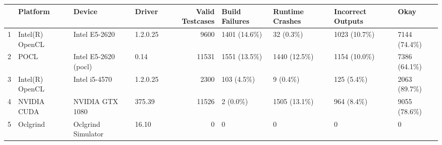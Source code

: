 \begin{tabular}{llllrllll}
\toprule
{} &         Platform &                Device &    Driver &  Valid Testcases & Build Failures & Runtime Crashes & Incorrect Outputs &          Okay \\
\midrule
1 &  Intel(R) OpenCL &         Intel E5-2620 &  1.2.0.25 &             9600 &   1401 (14.6\%) &       32 (0.3\%) &      1023 (10.7\%) &  7144 (74.4\%) \\
2 &             POCL &  Intel E5-2620 (pocl) &      0.14 &            11531 &   1551 (13.5\%) &    1440 (12.5\%) &      1154 (10.0\%) &  7386 (64.1\%) \\
3 &  Intel(R) OpenCL &         Intel i5-4570 &  1.2.0.25 &             2300 &     103 (4.5\%) &        9 (0.4\%) &        125 (5.4\%) &  2063 (89.7\%) \\
4 &      NVIDIA CUDA &       NVIDIA GTX 1080 &    375.39 &            11526 &       2 (0.0\%) &    1505 (13.1\%) &        964 (8.4\%) &  9055 (78.6\%) \\
5 &         Oclgrind &    Oclgrind Simulator &     16.10 &                0 &              0 &               0 &                 0 &             0 \\
\bottomrule
\end{tabular}
